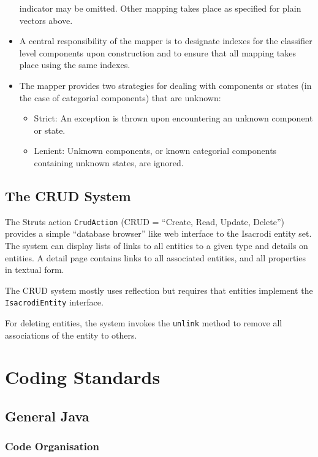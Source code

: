 \documentclass[a4paper,fleqn]{article}
\newcommand{\computercode}[1]{\texttt{#1}}
\begin{document}
\begin{itemize}
  indicator may be omitted. Other mapping takes place as specified for
  plain vectors above.
\item A central responsibility of the mapper is to designate indexes
  for the classifier level components upon construction and to ensure
  that all mapping takes place using the same indexes.
\item The mapper provides two strategies for dealing with components
  or states (in the case of categorial components) that are unknown:
  \begin{itemize}
  \item Strict: An exception is thrown upon encountering an unknown
    component or state.
  \item Lenient: Unknown components, or known categorial components
    containing unknown states, are ignored.
  \end{itemize}
\end{itemize}


\subsection{The CRUD System}

The Struts action \computercode{CrudAction} (CRUD = ``Create, Read,
Update, Delete'') provides a simple ``database browser'' like web
interface to the Isacrodi entity set. The system can display lists of
links to all entities to a given type and details on entities. A
detail page contains links to all associated entities, and all
properties in textual form.

The CRUD system mostly uses reflection but requires that entities
implement the \computercode{IsacrodiEntity} interface.

For deleting entities, the system invokes the \computercode{unlink}
method to remove all associations of the entity to others.

\section{Coding Standards}


\subsection{General Java}

\subsubsection{Code Organisation}
\end{document}
